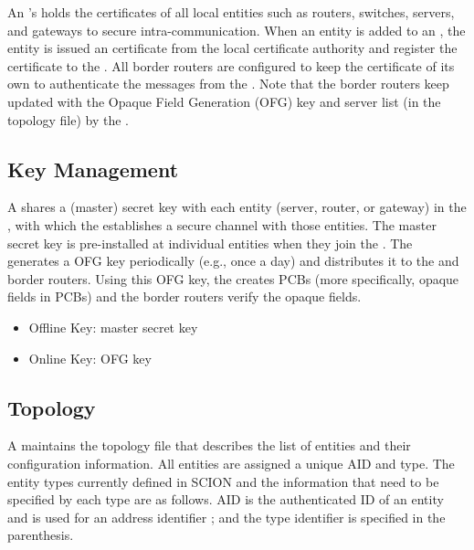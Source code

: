  An \AD's \CS holds the certificates of all local entities such as routers, switches, servers, and gateways to secure intra-\AD communication. When an entity is added to an \AD, the entity is issued an certificate from the local certificate authority and register the certificate to the \CS. All border routers are configured to keep the \CS certificate of its own \AD to authenticate the messages from the \CS. Note that the border routers keep updated with the Opaque Field Generation (OFG) key and server list (in the topology file) by the \CS.


\subsection{Key Management}
A \CS shares a (master) secret key with each entity (server, router, or gateway) in the \AD, with which the \CS establishes a secure channel with those entities. The master secret key is pre-installed at individual entities when they join the \AD{}. The \CS generates a OFG key periodically (e.g., once a day) and distributes it to the \BS and border routers. Using this OFG key, the \BS creates PCBs (more specifically, opaque fields in PCBs) and the border routers verify the opaque fields. 

\begin{itemize}
\item {Offline Key: } master secret key
\item {Online Key: } OFG key
\end{itemize}



\subsection{Topology}
A \CS maintains the \AD topology file that describes the list of entities and their configuration information.
All entities are assigned a unique AID and type. The entity types currently defined in SCION and the information that need to be specified by each type are as follows.
AID is the authenticated ID of an entity and is used for an address identifier ; and the type identifier is specified in the parenthesis.

